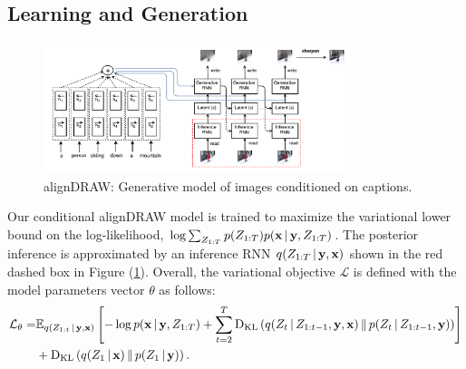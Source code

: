 \documentclass{article} %
\newcommand{\given}{\,|\,}
\newcommand{\expectation}{\mathbb{E}}
\newcommand{\kldiv}{\mathrm{D}_{\rm KL}}
\newcommand{\klBars}{\,\|\,}
\newcommand{\Lat}{Z}
\newcommand{\icaption}{{\bf{y}}}
\newcommand{\oimage}{{\bf{x}}}
\newcommand{\post}{q}
\newcommand{\prior}{p}
\newcommand{\loss}{\mathcal{L}}
\begin{document}
\vspace{-0.2cm}
\subsection{Learning and Generation}

\begin{figure}[!h]
\vspace{-0.3in}
\captionsetup[subfigure]{labelformat=empty}
\begin{center}
\includegraphics[width=0.8\textwidth]{figures/alignDraw-cropped.pdf}\quad
%
\end{center}
\vspace{-0.2in}
\caption{alignDRAW: Generative model of images conditioned on captions.}
\label{fig:figmodel}
\vspace{-0.2in}
\end{figure}

Our conditional alignDRAW model is trained to maximize the variational lower bound on the log-likelihood, $\log \sum_{\Lat_{1:T}} \prior(\Lat_{1:T})p(\oimage\given\icaption, \Lat_{1:T})$. The posterior inference is approximated by an inference RNN $\post(\Lat_{1:T}\given\icaption,\oimage)$ shown in the red dashed box in Figure (\ref{fig:figmodel}).   
Overall, the variational objective $\loss$ is defined with the model parameters vector $\theta$ as follows:
\begin{align}
\vspace{-0.1in}
\small
\loss_\theta =  &\expectation_{\post(\Lat_{1:t}\given\icaption,\oimage)}\left[ - \log p(\oimage\given\icaption,\Lat_{1:T}) + \sum_{t=2}^T\kldiv\left(\post(\Lat_t\given\Lat_{1:t-1},\icaption,\oimage)\klBars\prior(\Lat_t\given\Lat_{1:t-1},\icaption)\right) \right] \nonumber \\& + \kldiv\left(\post(\Lat_1\given\oimage)\klBars\prior(\Lat_1\given\icaption)\right).
\end{align}
\end{document}
